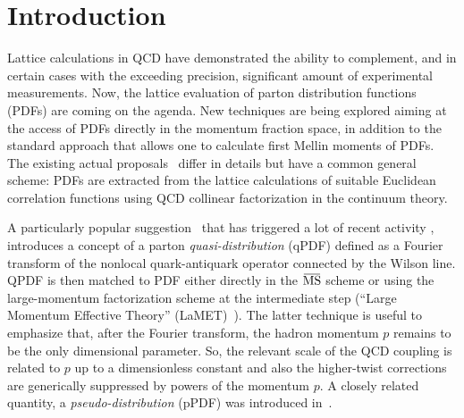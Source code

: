 \section{Introduction}\label{sect_introduction1}%
%

Lattice calculations in QCD have demonstrated the ability to complement, and in certain cases with the exceeding precision, significant amount of experimental measurements.  Now, the lattice evaluation of parton distribution functions (PDFs) are coming on the agenda. New techniques are being explored aiming at the access of PDFs directly in the momentum fraction space, in addition to the standard approach that allows one to calculate first Mellin moments of PDFs. The existing actual proposals~\cite{Aglietti:1998ur,Abada:2001if,Detmold:2005gg,Braun:2007wv,Ji:2013dva,Ma:2017pxb} differ in details but have a common general scheme: PDFs are extracted from the lattice calculations of suitable Euclidean correlation functions using QCD collinear factorization in the continuum theory. 

A particularly popular suggestion~\cite{Ji:2013dva} that has triggered  a lot of recent activity \cite{Lin:2014zya,Alexandrou:2015rja,Chen:2016utp,Alexandrou:2016jqi,Lin:2017ani,Zhang:2017bzy,Chen:2017gck,Chen:2017mzz,Alexandrou:2017huk, Alexandrou:2018pbm,Chen:2018xof,Chen:2018fwa,Alexandrou:2018eet,
Lin:2018qky}, introduces a concept of a parton \emph{quasi-distribution} (qPDF) defined as a Fourier transform of the nonlocal quark-antiquark operator connected by the Wilson line. QPDF is then matched to PDF either directly in the $\MSbar$ scheme or using the large-momentum factorization scheme at the intermediate step (``Large Momentum Effective Theory'' (LaMET)~\cite{Ji:2014gla,Izubuchi:2018srq}). The latter technique is useful to emphasize that, after the Fourier transform, the hadron momentum $p$ remains to be the only dimensional parameter. So, the relevant scale of the QCD coupling is related to $p$ up to a dimensionless constant and also the higher-twist corrections are generically suppressed by powers of the momentum $p$. A closely related quantity, a \emph{pseudo-distribution} (pPDF) was introduced in~\cite{Radyushkin:2017cyf,Orginos:2017kos,Karpie:2017bzm}.
 
